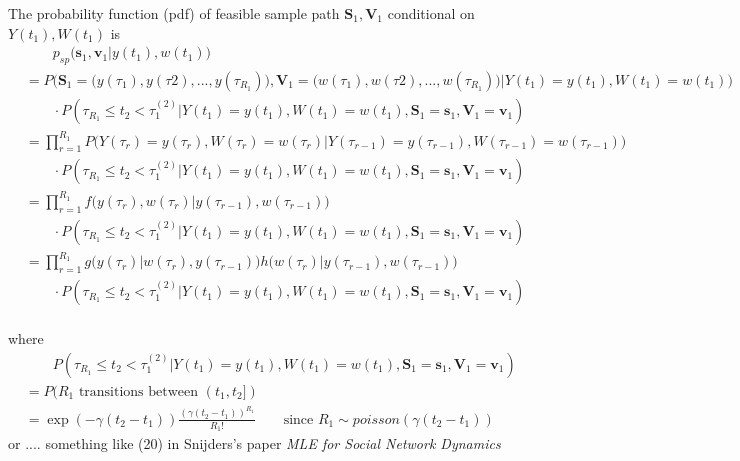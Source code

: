 \documentclass[10pt,letterpaper]{article}
\numberwithin{table}{section}
\numberwithin{figure}{section}
\numberwithin{equation}{section}
\begin{document}
The probability function (pdf) of feasible sample path $\bm S_1, \bm V_1$ conditional on $Y(t_1), W(t_1)$ is 
\begin{equation}
\begin{split}
& \qquad p_{sp} \Big( \bm s_1, \bm v_1 | y(t_1), w(t_1)) \\
&= P\Big(
\bm S_1 =\big(y(\tau_1), y(\tau2),...,y(\tau_{R_1})\big), \bm V_1 =\big(w(\tau_1), w(\tau2),...,w(\tau_{R_1})\big)|Y(t_1) = y(t_1), W(t_1) = w(t_1)
\Big) \\
& \qquad \cdot P(\tau_{R_1} \leq t_2 < \tau_1^{(2)} |Y(t_1) = y(t_1),W(t_1) = w(t_1),\bm S_1 = \bm s_1, \bm V_1 = \bm v_1)
 \\
& =\prod_{r = 1}^{R_1} P\Big(
Y(\tau_r)=y(\tau_r),W(\tau_r) = w(\tau_r)|Y(\tau_{r-1}) = y(\tau_{r-1}),W(\tau_{r-1}) = w(\tau_{r-1})
\Big)  \\
& \qquad \cdot P(\tau_{R_1} \leq t_2 < \tau_1^{(2)} |Y(t_1) = y(t_1),W(t_1) = w(t_1),\bm S_1 = \bm s_1, \bm V_1 = \bm v_1)
 \\
& = \prod_{r = 1}^{R_1} f\Big(
y(\tau_r),w(\tau_r)| y(\tau_{r-1}), w(\tau_{r-1})
\Big)  \\
& \qquad \cdot P(\tau_{R_1} \leq t_2 < \tau_1^{(2)} |Y(t_1) = y(t_1),W(t_1) = w(t_1),\bm S_1 = \bm s_1, \bm V_1 = \bm v_1)
 \\
 & =  \prod_{r = 1}^{R_1}
g\Big( y(\tau_r)| w(\tau_{r}), y(\tau_{r-1})
\Big) h\Big( w(\tau_r)| y(\tau_{r-1}), w(\tau_{r-1})
\Big) \\
& \qquad \cdot P(\tau_{R_1} \leq t_2 < \tau_1^{(2)} |Y(t_1) = y(t_1),W(t_1) = w(t_1),\bm S_1 = \bm s_1, \bm V_1 = \bm v_1)
 \\
\end{split}
\end{equation} 


where 
\begin{equation}
\begin{split}
& \qquad 
P(\tau_{R_1} \leq t_2 < \tau_1^{(2)} |Y(t_1) = y(t_1),W(t_1) = w(t_1),\bm S_1 = \bm s_1, \bm V_1 = \bm v_1)\\
&= P({R_1}\text{ transitions between }(t_1, t_2])  \\
& = \exp (-\gamma (t_2 -t_1)) 
\frac{(\gamma (t_2 -t_1))^{R_1}}{R_1!}
\qquad \text{since } R_1 \sim poisson (\gamma(t_2-t_1))
\end{split}
\end{equation} 
or .... something like (20) in Snijders's paper \textit{MLE for Social Network Dynamics }
\end{document}
